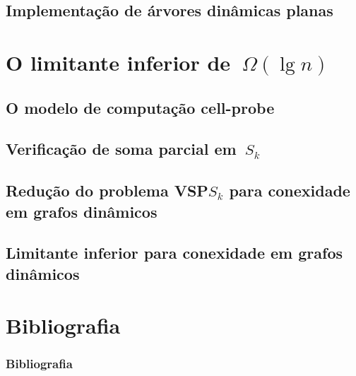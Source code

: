 \documentclass{IFES-beamer}
\begin{document}
\subsection{Implementação de árvores dinâmicas planas}


\section{O limitante inferior de~$\Omega(\lg n)$}
\subsection{O modelo de computação cell-probe}
\subsection{Verificação de soma parcial em~$S_k$}
\subsection[Redução do VSP$S_k$ para conexidade em grafos dinâmicos]{Redução do problema VSP$S_k$ para conexidade em grafos dinâmicos}
\subsection{Limitante inferior para conexidade em grafos dinâmicos}


\section{Bibliografia}
\begin{frame}[allowframebreaks]
\frametitle{Bibliografia}

    
\end{frame}
\end{document}
